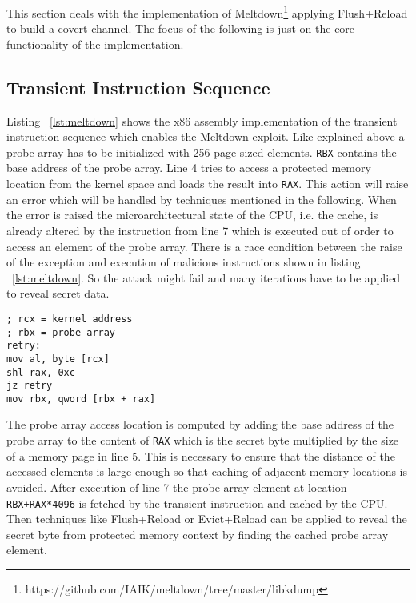 \documentclass[a4paper,oneside,openright] {scrreprt}
\begin{document}
This section deals with the implementation of Meltdown\footnote{https://github.com/IAIK/meltdown/tree/master/libkdump} applying
Flush+Reload to build a covert channel. The focus of the following is just on the core functionality of the implementation.

\subsection{Transient Instruction Sequence}
\label{ch:TransientInstructionSequence}

Listing ~\ref{lst:meltdown} shows the x86 assembly implementation of the transient instruction sequence
which enables the Meltdown exploit.
Like explained above a probe array has to be initialized with 256 page sized elements.
\texttt{RBX} contains the base address of the probe array.
Line 4 tries to access a protected memory location from the kernel space and loads the result into \texttt{RAX}. 
This action will raise an error which will be handled by techniques mentioned in the following.
When the error is raised the microarchitectural state of the CPU, i.e. the cache, is already altered 
by the instruction from line 7 which is executed out of order to access an element of the probe array.
There is a race condition between the raise of the exception and execution of malicious instructions shown in listing ~\ref{lst:meltdown}.
So the attack might fail and many iterations have to be applied to reveal secret data.

\begin{lstlisting}[language={[x86masm]Assembler}, caption=Meltdown: Transient Instruction Sequence, label={lst:meltdown}]
; rcx = kernel address
; rbx = probe array
retry:
mov al, byte [rcx]
shl rax, 0xc
jz retry
mov rbx, qword [rbx + rax]
\end{lstlisting}

The probe array access location is computed by adding the base address of the probe array to the content of \texttt{RAX} which 
is the secret byte multiplied by the size of a memory page in line 5.
This is necessary to ensure that the distance of the accessed elements is large enough so that caching of adjacent memory locations
is avoided.
After execution of line 7 the probe array element at location \texttt{RBX+RAX*4096} is fetched by the transient instruction and
cached by the CPU. 
Then techniques like Flush+Reload or Evict+Reload can be applied to reveal the secret byte from protected memory context by finding
the cached probe array element.
\end{document}
